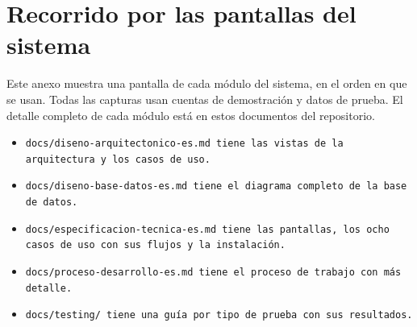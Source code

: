\FloatBarrier
\section{Recorrido por las pantallas del sistema}\label{sec:anexo}

Este anexo muestra una pantalla de cada módulo del sistema, en el orden en que se usan. Todas las capturas usan cuentas de demostración y datos de prueba. El detalle completo de cada módulo está en estos documentos del repositorio.

\begin{itemize}
  \item \tt{docs/diseno-arquitectonico-es.md} tiene las vistas de la arquitectura y los casos de uso.
  \item \tt{docs/diseno-base-datos-es.md} tiene el diagrama completo de la base de datos.
  \item \tt{docs/especificacion-tecnica-es.md} tiene las pantallas, los ocho casos de uso con sus flujos y la instalación.
  \item \tt{docs/proceso-desarrollo-es.md} tiene el proceso de trabajo con más detalle.
  \item \tt{docs/testing/} tiene una guía por tipo de prueba con sus resultados.
\end{itemize}


